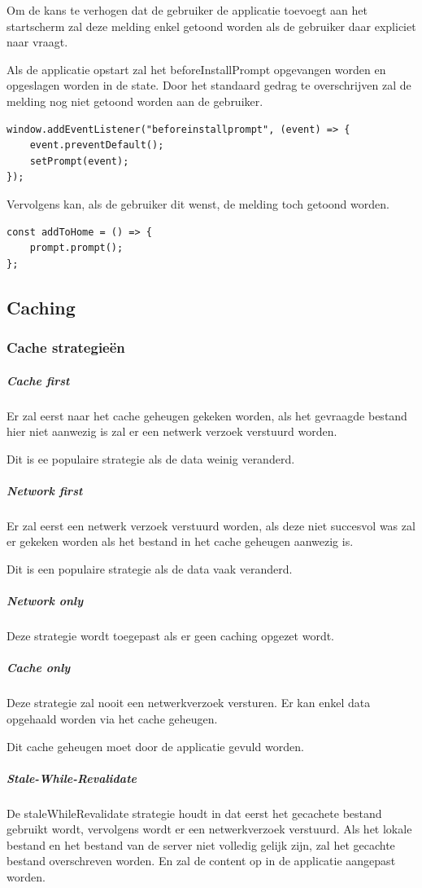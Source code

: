 		Om de kans te verhogen dat de gebruiker de applicatie toevoegt aan het startscherm zal deze melding enkel getoond worden als de gebruiker daar expliciet naar vraagt.
		\autocite{Mclachlan2020}
		
		Als de applicatie opstart zal het beforeInstallPrompt opgevangen worden en opgeslagen worden in de state. Door het standaard gedrag te overschrijven zal de melding nog niet getoond worden aan de gebruiker.
		\autocite{LePage2020b}
		
\begin{lstlisting}
window.addEventListener("beforeinstallprompt", (event) => {
	event.preventDefault();
	setPrompt(event);
}); 
\end{lstlisting}

		Vervolgens kan, als de gebruiker dit wenst, de melding toch getoond worden.
		
\begin{lstlisting}
const addToHome = () => {
	prompt.prompt();
};
\end{lstlisting}
	\subsection{Caching}
	
		\subsubsection{Cache strategieën}
		
			\subparagraph{Cache first}
				Er zal eerst naar het cache geheugen gekeken worden, als het gevraagde bestand hier niet aanwezig is zal er een netwerk verzoek verstuurd worden.
				
				Dit is ee populaire strategie als de data weinig veranderd. 
			\subparagraph{Network first}
				Er zal eerst een netwerk verzoek verstuurd worden, als deze niet succesvol was zal er gekeken worden als het bestand in het cache geheugen aanwezig is. 
				
				Dit is een populaire strategie als de data vaak veranderd.
			\subparagraph{Network only}
				Deze strategie wordt toegepast als er geen caching opgezet wordt. 
			\subparagraph{Cache only}
				Deze strategie zal nooit een netwerkverzoek versturen. Er kan enkel data opgehaald worden via het cache geheugen.
				
				Dit cache geheugen moet door de applicatie gevuld worden.
			\subparagraph{Stale-While-Revalidate}
				De staleWhileRevalidate strategie houdt in dat eerst het gecachete bestand gebruikt wordt, vervolgens wordt er een netwerkverzoek verstuurd. Als het lokale bestand en het bestand van de server niet volledig gelijk zijn, zal het gecachte bestand overschreven worden. En zal de content op in de applicatie aangepast worden.
				
